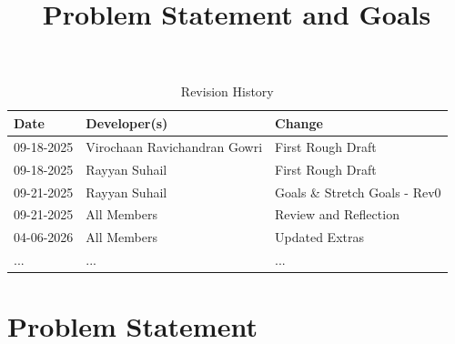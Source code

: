\documentclass{article}
\title{Problem Statement and Goals\\\progname}
\author{\authname}
\date{}
\begin{document}
\maketitle

\begin{table}[hp]
\caption{Revision History} \label{TblRevisionHistory}
\begin{tabularx}{\textwidth}{llX}
\toprule
\textbf{Date} & \textbf{Developer(s)} & \textbf{Change}\\
\midrule
09-18-2025 & Virochaan Ravichandran Gowri & First Rough Draft\\
09-18-2025 & Rayyan Suhail & First Rough Draft\\
09-21-2025 & Rayyan Suhail & Goals \& Stretch Goals - Rev0\\
09-21-2025 & All Members & Review and Reflection\\
04-06-2026 & All Members & Updated Extras\\
... & ... & ...\\
\bottomrule
\end{tabularx}
\end{table}
\newpage
\section{Problem Statement}
\end{document}
